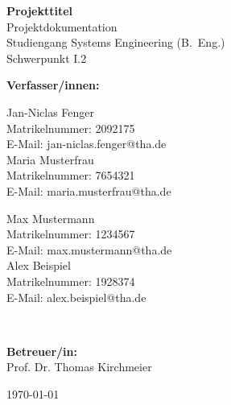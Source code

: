 \documentclass[a4paper,12pt,ngerman]{article}
\begin{document}
	
	\begin{titlepage}
		\centering
		\vspace*{1cm}
		
		{\LARGE \textbf{Projekttitel}}\\[1cm]
		
		{\large Projektdokumentation}\\[1.0cm]
		{\large Studiengang Systems Engineering (B.~Eng.)}\\[0.3cm]
		{\large Schwerpunkt I.2}\\[1.5cm]
		
		\vfill
    
		\textbf{Verfasser/innen:}\\[1cm]
    	\begin{center}
		\begin{minipage}[t]{0.45\textwidth}
        \raggedright
        Jan-Niclas Fenger \\
        Matrikelnummer: 2092175 \\
        E-Mail: jan-niclas.fenger@tha.de \\[0.5cm]
		
        Maria Musterfrau \\
        Matrikelnummer: 7654321 \\
        E-Mail: maria.musterfrau@tha.de
		\end{minipage}
		\hfill
		\begin{minipage}[t]{0.45\textwidth}
        \raggedright
        Max Mustermann \\
        Matrikelnummer: 1234567 \\
        E-Mail: max.mustermann@tha.de \\[0.5cm]
    
        Alex Beispiel \\
        Matrikelnummer: 1928374 \\
        E-Mail: alex.beispiel@tha.de
		\end{minipage}
		\\[1.5cm]
		\end{center}
		
		\textbf{Betreuer/in:}\\[0.5cm]
		Prof. Dr. Thomas Kirchmeier\\[3cm]
		
		\vfill
		
		{\large \today}
		
		\thispagestyle{empty} %
	\end{titlepage}
	
	\newpage
	\setcounter{page}{2}   %
	\tableofcontents
	\thispagestyle{plain}  %
	
	\newpage

	
\end{document}
